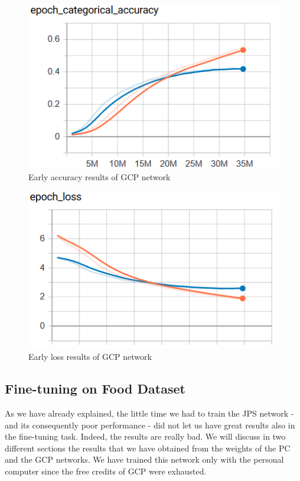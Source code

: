 \begin{figure}[!ht]
    \centering
    \includegraphics[scale=0.60]{images/GCP_early_accuracy.png}
    \caption{Early accuracy results of GCP network}
    \label{fig:early_GCP_acc}
\end{figure}
\begin{figure}[!ht]
    \centering
    \includegraphics[scale=0.60]{images/GCP_early_loss.png}
    \caption{Early loss results of GCP network}
    \label{fig:early_GCP_loss}
\end{figure}


\subsection{Fine-tuning on Food Dataset}
As we have already explained, the little time we had to train the JPS network - and its consequently poor performance - did not let us have great results also in the fine-tuning task. Indeed, the results are really bad.\newline
We will discuss in two different sections the results that we have obtained from the weights of the PC and the GCP networks. We have trained this network only with the personal computer since the free credits of GCP were exhausted.

